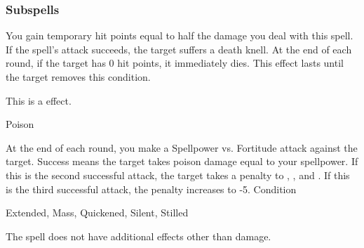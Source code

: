 \subsubsection{Subspells}
You gain temporary hit points equal to half the damage you deal with this spell.
If the spell's attack succeeds, the target suffers a death knell.
At the end of each round, if the target has 0 hit points, it immediately dies.
This effect lasts until the target removes this condition.
\par
This is a  effect.
\begin{spellsection}{Poison}
\begin{spellheader}
\end{spellheader}
\begin{spellcontent}
\begin{spelltargetinginfo}
\end{spelltargetinginfo}
\begin{spelleffects}
\spelleffect
At the end of each round, you make a Spellpower vs. Fortitude attack against the target.
Success means the target takes poison damage equal to your spellpower.
If this is the second successful attack, the target takes a  penalty to , , and .
If this is the third successful attack, the penalty increases to -5.
\spelldur Condition
\end{spelleffects}
\end{spellcontent}
\begin{spellfooter}
 Extended, Mass, Quickened, Silent, Stilled
\end{spellfooter}
\begin{spellsubcontent}
\begin{spellcantrip}
The spell does not have additional effects other than damage.
\end{spellcantrip}
\end{spellsubcontent}
\end{spellsection}
